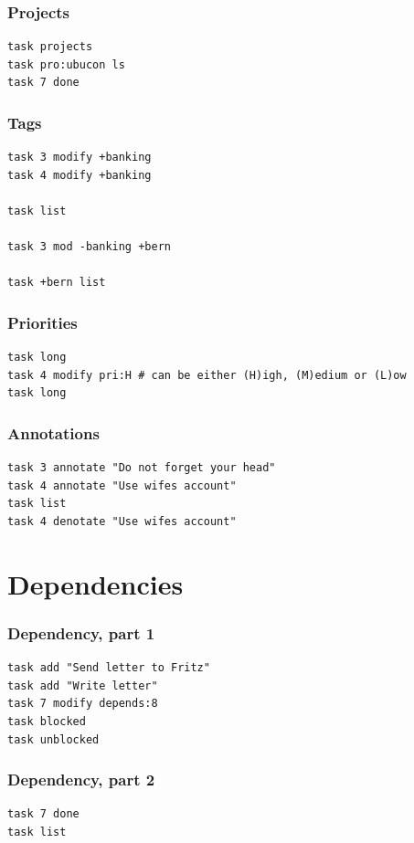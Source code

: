 \documentclass[t,handout]{beamer}
\begin{document}
\begin{frame}[fragile]\frametitle{Projects}
    \vfill
    \begin{lstlisting}
task projects
task pro:ubucon ls
task 7 done
\end{lstlisting}
\end{frame}

\begin{frame}[fragile]\frametitle{Tags}
    \vfill
    \begin{lstlisting}
task 3 modify +banking
task 4 modify +banking

task list

task 3 mod -banking +bern

task +bern list
\end{lstlisting}
\end{frame}

\begin{frame}[fragile]\frametitle{Priorities}
    \vfill
    \begin{lstlisting}
task long
task 4 modify pri:H # can be either (H)igh, (M)edium or (L)ow
task long
\end{lstlisting}
\end{frame}

\begin{frame}[fragile]\frametitle{Annotations}
    \vfill
    \begin{lstlisting}
task 3 annotate "Do not forget your head"
task 4 annotate "Use wifes account"
task list
task 4 denotate "Use wifes account"
\end{lstlisting}
\end{frame}

\section{Dependencies}

\begin{frame}[fragile]\frametitle{Dependency, part 1}
    \vfill
    \begin{lstlisting}
task add "Send letter to Fritz"
task add "Write letter"
task 7 modify depends:8
task blocked
task unblocked
\end{lstlisting}
\end{frame}

\begin{frame}[fragile]\frametitle{Dependency, part 2}
    \vfill
    \begin{lstlisting}
task 7 done
task list
\end{lstlisting}
\end{frame}
\end{document}
